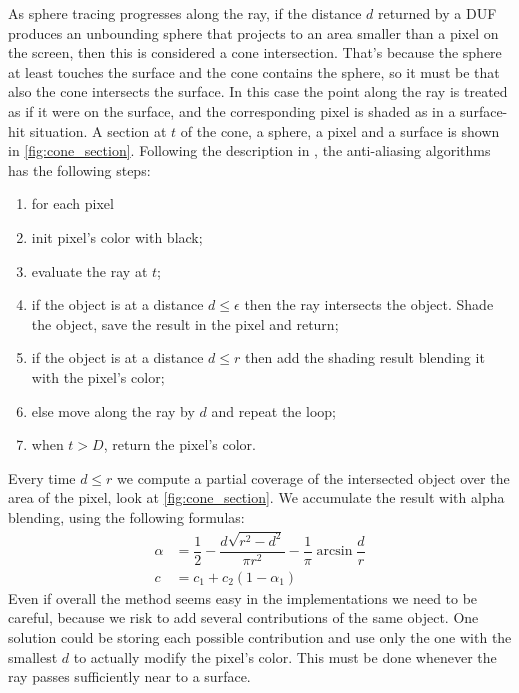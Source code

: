 As sphere tracing progresses along the ray, if the distance $d$ returned by a DUF produces an unbounding sphere that projects to an area smaller than a pixel on the screen, then this is considered a cone intersection.
That's because the sphere at least touches the surface and the cone contains the sphere, so it must be that also the cone intersects the surface.
In this case the point along the ray is treated as if it were on the surface, and the corresponding pixel is shaded as in a surface-hit situation.
A section at $t$ of the cone, a sphere, a pixel and a surface is shown in \autoref{fig:cone_section}.
Following the description in \cite{scratch_sdf}, the anti-aliasing algorithms has the following steps:
\begin{enumerate}
  \item for each pixel
  \item init pixel's color with black;
  \item evaluate the ray at $t$;
  \item if the object is at a distance $d \leq \epsilon$ then the ray intersects the object.
    Shade the object, save the result in the pixel and return;
  \item if the object is at a distance $d \leq r$ then add the shading result blending it with the pixel's color;
  \item else move along the ray by $d$ and repeat the loop;
  \item when $t > D$, return the pixel's color.
\end{enumerate}
Every time $d \leq r$ we compute a partial coverage of the intersected object over the area of the pixel, look at \autoref{fig:cone_section}.
We accumulate the result with alpha blending, using the following formulas:
\begin{align*}
  \alpha &= \dfrac {1}{2} - \dfrac {d \sqrt{r^2 - d^2}} {\pi r^2} - \dfrac{1}{\pi}\arcsin \dfrac {d}{r}\\
  c &= c_1 + c_2 (1 - \alpha_1)
\end{align*}
Even if overall the method seems easy in the implementations we need to be careful, because we risk to add several contributions of the same object.
One solution could be storing each possible contribution and use only the one with the smallest $d$ to actually modify the pixel's color.
This must be done whenever the ray passes sufficiently near to a surface.

